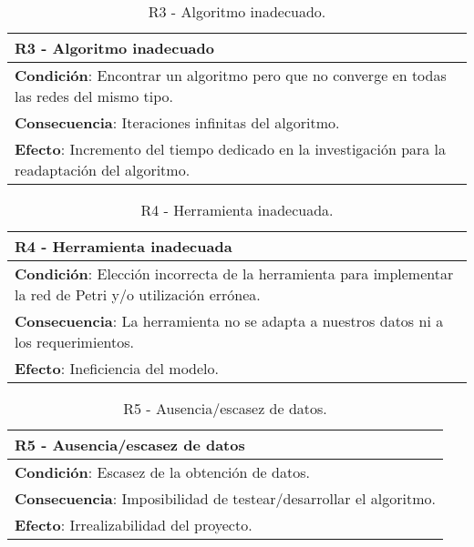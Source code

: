 \begin{table}[H]
    \centering
    \begin{tabular}{|p{13.7cm}|}
    \hline
    \textbf{R3 - Algoritmo inadecuado} \\
    \hline \hline 
    \textbf{Condición}: Encontrar un algoritmo pero que no converge en todas las redes del mismo tipo.\\
    \hline
    \textbf{Consecuencia}: Iteraciones infinitas del algoritmo. \\
    \hline
    \textbf{Efecto}: Incremento del tiempo dedicado en la investigación para la readaptación del algoritmo. \\
    \hline
    \end{tabular}
    \label{tab:R3}
    \caption{R3 - Algoritmo inadecuado.}
\end{table}

\begin{table}[H]
    \centering
    \begin{tabular}{|p{13.7cm}|}
    \hline
    \textbf{R4 - Herramienta inadecuada} \\
    \hline \hline 
    \textbf{Condición}: Elección incorrecta de la herramienta para implementar la red de Petri y/o utilización errónea.\\
    \hline
    \textbf{Consecuencia}: La herramienta no se adapta a nuestros datos ni a los requerimientos. \\
    \hline
    \textbf{Efecto}: Ineficiencia del modelo. \\
    \hline
    \end{tabular}
    \label{tab:R4}
    \caption{R4 - Herramienta inadecuada.}
\end{table}

\begin{table}[H]
    \centering
    \begin{tabular}{|p{13.7cm}|}
    \hline
    \textbf{R5 - Ausencia/escasez de datos} \\
    \hline \hline 
    \textbf{Condición}: Escasez de la obtención de datos.\\
    \hline
    \textbf{Consecuencia}: Imposibilidad de testear/desarrollar el algoritmo. \\
    \hline
    \textbf{Efecto}: Irrealizabilidad del proyecto. \\
    \hline
    \end{tabular}
    \label{tab:R5}
    \caption{R5 - Ausencia/escasez de datos.}
\end{table}

